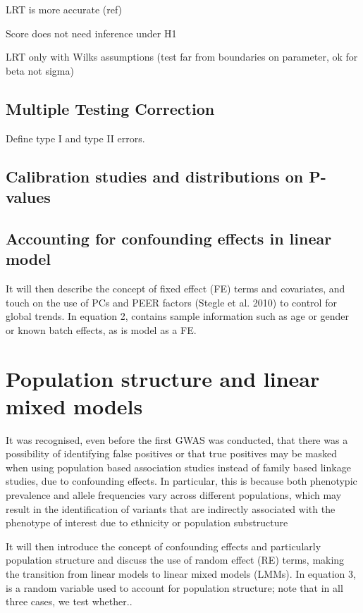 LRT is more accurate (ref)

Score does not need inference under H1

LRT only with Wilks assumptions (test far from boundaries on parameter, ok for beta not sigma)


\subsection{Multiple Testing Correction}

Define type I and type II errors. 

\subsection{Calibration studies and distributions on P-values}

\subsection{Accounting for confounding effects in linear model}

It will then describe the concept of fixed effect (FE) terms and covariates, and touch on the use of PCs and PEER factors (Stegle et al. 2010) to control for global trends. In equation 2,  contains sample information such as age or gender or known batch effects, as is model as a FE.

\section{Population structure and linear mixed models}

It was recognised, even before the first GWAS was conducted, that there was a
possibility of identifying false positives or that true positives may be masked when
using population based association studies instead of family based linkage studies,
due to confounding effects. In particular, this is because both phenotypic
prevalence and allele frequencies vary across different populations, which may result
in the identification of variants that are indirectly associated with the phenotype of
interest due to ethnicity or population substructure

It will then introduce the concept of confounding effects and particularly population structure and discuss the use of random effect (RE) terms, making the transition from linear models to linear mixed models (LMMs). In equation 3,  is a random variable used to account for population structure; note that in all three cases, we test whether..


